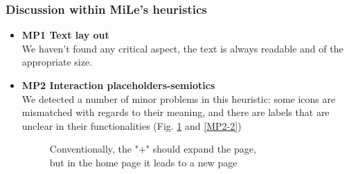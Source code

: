 \subsubsection{Discussion within MiLe's heuristics}
\begin{itemize}
    \item \textbf{MP1 Text lay out}\\
        We haven't found any critical aspect, the text is always readable and of the appropriate size.\\
    \item \textbf{MP2 Interaction placeholders-semiotics}\\
        We detected a number of minor problems in this heuristic: some icons are mismatched with regards to their meaning, and there are labels that are unclear in their functionalities (Fig. \ref{MP2-1} and \ref{MP2-2})
        \begin{figure}[!ht]
            \begin{minipage}{\linewidth}
                \centering
                \captionsetup{justification=centering}
                \caption{Conventionally, the "+" should expand the page,\\
                but in the home page it leads to a new page}
                \label{MP2-1}
            \end{minipage}
        \end{figure}
        \begin{figure}[!ht]
            \begin{minipage}{\linewidth}
                \centering

\end{minipage}
\end{figure}
\end{itemize}
